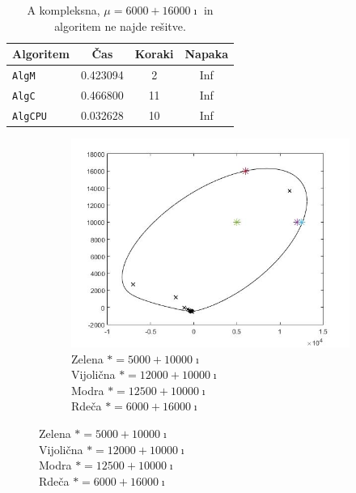 \documentclass[12pt,a4paper]{amsart}
\theoremstyle{definition}
\theoremstyle{plain}
\begin{document}
\begin{table}[H]
\caption{A kompleksna, $\mu = 6000+16000\imath$ in algoritem ne najde rešitve.}
\begin{tabular}{|l|c|c|c|}
\hline
Algoritem & Čas & Koraki & Napaka\\
\hline
\hline
\verb+AlgM+ &0.423094 &2&Inf\\
\hline
\verb+AlgC+ &0.466800&11&Inf \\
\hline
\verb+AlgCPU+ &0.032628&10&Inf  \\
\hline
\end{tabular}

\label{t10}
\end{table}

\begin{figure}[H]
\renewcommand*\thesubfigure{\Alph{subfigure}}
\begin{subfigure}[t]{0.5\textwidth}
\includegraphics[width=0.9\linewidth]{CC.jpg}
\caption{Zelena $\ast = 5000+10000\imath$\\
Vijolična $\ast = 12000+10000\imath$\\
Modra $\ast = 12500+10000\imath$\\
Rdeča $\ast = 6000+16000\imath$\\}


\end{subfigure}
\end{figure}
\end{document}
